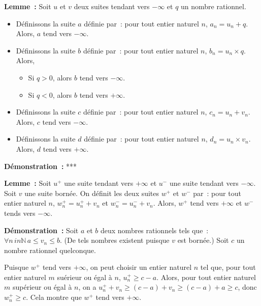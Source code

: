 \noindent\textbf{Lemme :} Soit $u$ et $v$ deux suites tendant vers $-\infty$ et $q$ un nombre rationnel.
    \begin{itemize}[nosep]
        \item Définissons la suite $a$ définie par : pour tout entier naturel $n$, $a_n = u_n + q$.
            Alors, $a$ tend vers $-\infty$.
        \item Définissons la suite $b$ définie par : pour tout entier naturel $n$, $b_n = u_n \times q$.
            Alors, 
            \begin{itemize}[nosep]
                \item Si $q > 0$, alors $b$ tend vers $-\infty$.
                \item Si $q < 0$, alors $b$ tend vers $+\infty$.
            \end{itemize}
        \item Définissons la suite $c$ définie par : pour tout entier naturel $n$, $c_n = u_n + v_n$.
            Alors, $c$ tend vers $-\infty$.
        \item Définissons la suite $d$ définie par : pour tout entier naturel $n$, $d_n = u_n \times v_n$.
            Alors, $d$ tend vers $+\infty$.
    \end{itemize}

\medskip

\noindent\textbf{Démonstration :} ***

\medskip

\noindent\textbf{Lemme :} Soit $u^+$ une suite tendant vers $+\infty$ et $u^-$ une suite tendant vers $-\infty$.
    Soit $v$ une suite bornée.
    On définit les deux suites $w^+$ et $w^-$ par : pour tout entier naturel $n$, $w^+_n = u^+_n + v_n$ et $w^-_n = u^ -_n + v_n$.
    Alors, $w^+$ tend vers $+\infty$ et $w^-$ tends vers $-\infty$.

\medskip

\noindent\textbf{Démonstration :} 
    Soit $a$ et $b$ deux nombres rationnels tels que : $\forall n \, in \mathbb{N} \, a \leq v_n \leq b$. 
    (De tels nombres existent puisque $v$ est bornée.)
    Soit $c$ un nombre rationnel quelconque.

    Puisque $w^+$ tend vers $+\infty$, on peut choisir un entier naturel $n$ tel que, pour tout entier naturel $m$ suérieur ou égal à $n$, $u^+_n \geq c - a$.
    Alors, pour tout entier naturel $m$ supérieur ou égal à $n$, on a $u^+_n + v_n \geq (c - a) + v_n \geq (c - a) + a \geq c$, donc $w^+_n \geq c$.
    Cela montre que $w^+$ tend vers $+\infty$.
    
